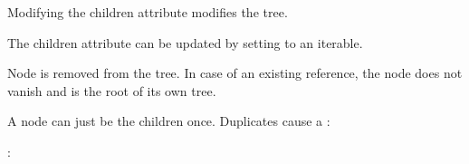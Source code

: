 \documentclass[letterpaper,10pt,english]{sphinxmanual}
\begin{document}
\begin{fulllineitems}
\begin{fulllineitems}
Modifying the children attribute modifies the tree.


The children attribute can be updated by setting to an iterable.

\begin{sphinxVerbatim}[commandchars=\\\{\}]
  \PYG{p}{[} \PYG{p}{]}
\end{sphinxVerbatim}

Node  is removed from the tree.
In case of an existing reference, the node  does not vanish and is the root of its own tree.

\begin{sphinxVerbatim}[commandchars=\\\{\}]
\end{sphinxVerbatim}


\begin{sphinxVerbatim}[commandchars=\\\{\}]
  
  \PYG{p}{[}  \PYG{p}{]}
\end{sphinxVerbatim}


A node can just be the children once. Duplicates cause a :

\begin{sphinxVerbatim}[commandchars=\\\{\}]
  \PYG{p}{[}   \PYG{p}{]}
: 
\end{sphinxVerbatim}


\end{fulllineitems}
\end{fulllineitems}
\end{document}
